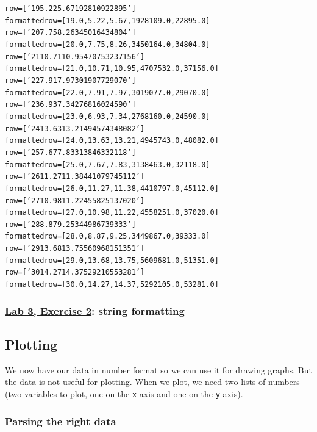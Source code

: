 \documentclass[letterpaper,10pt,english]{/usr/local/lib/python2.7/dist-packages/sphinx/texinputs/sphinxhowto}
\newenvironment{InvisibleVerbatim}
        {\begin{mdframed}[leftmargin=0.1\linewidth,innerleftmargin=3pt,innerrightmargin=3pt, userdefinedwidth=1\linewidth, linewidth=0pt, linecolor=white, usetwoside=false]}
        {\end{mdframed}}
\begin{document}
\begin{InvisibleVerbatim}
\begin{alltt}
row =  ['19         5.22            5.67            1928109   22895']
formatted row =  [19.0, 5.22, 5.67, 1928109.0, 22895.0]
row =  ['20         7.75            8.26            3450164   34804']
formatted row =  [20.0, 7.75, 8.26, 3450164.0, 34804.0]
row =  ['21        10.71           10.95            4707532   37156']
formatted row =  [21.0, 10.71, 10.95, 4707532.0, 37156.0]
row =  ['22         7.91            7.97            3019077   29070']
formatted row =  [22.0, 7.91, 7.97, 3019077.0, 29070.0]
row =  ['23         6.93            7.34            2768160   24590']
formatted row =  [23.0, 6.93, 7.34, 2768160.0, 24590.0]
row =  ['24        13.63           13.21            4945743   48082']
formatted row =  [24.0, 13.63, 13.21, 4945743.0, 48082.0]
row =  ['25         7.67            7.83            3138463   32118']
formatted row =  [25.0, 7.67, 7.83, 3138463.0, 32118.0]
row =  ['26        11.27           11.38            4410797   45112']
formatted row =  [26.0, 11.27, 11.38, 4410797.0, 45112.0]
row =  ['27        10.98           11.22            4558251   37020']
formatted row =  [27.0, 10.98, 11.22, 4558251.0, 37020.0]
row =  ['28         8.87            9.25            3449867   39333']
formatted row =  [28.0, 8.87, 9.25, 3449867.0, 39333.0]
row =  ['29        13.68           13.75            5609681   51351']
formatted row =  [29.0, 13.68, 13.75, 5609681.0, 51351.0]
row =  ['30        14.27           14.37            5292105   53281']
formatted row =  [30.0, 14.27, 14.37, 5292105.0, 53281.0]
\end{alltt}

            \end{InvisibleVerbatim}
            
        
    
\subsubsection{\href{https://docs.google.com/document/d/1ANWBTbUPTIh\_tL5QjEm4udTCBL0COGJNRzAp5StX5wg/edit?usp=sharing}{Lab
3, Exercise 2}: string formatting}\subsection{Plotting}

We now have our data in number format so we can use it for drawing
graphs. But the data is not useful for plotting. When we plot, we need
two lists of numbers (two variables to plot, one on the \texttt{x} axis
and one on the \texttt{y} axis).\subsubsection{Parsing the right data}
\end{document}
